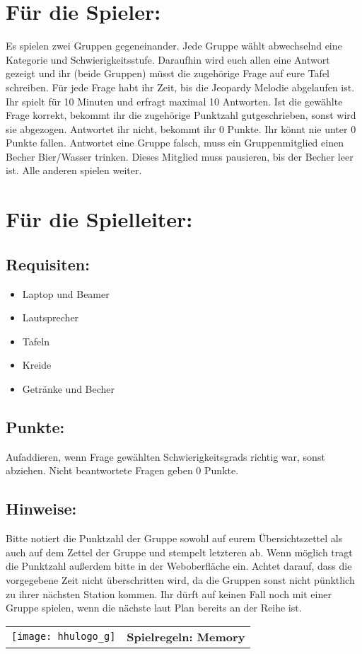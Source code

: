 \documentclass[a4paper,10pt]{article}
\def\spielg{Memory}
\newcommand{\unten}{
 Bitte notiert die Punktzahl der Gruppe sowohl auf eurem Übersichtszettel als auch auf dem Zettel der Gruppe und stempelt letzteren ab. Wenn möglich tragt die Punktzahl außerdem bitte in der Weboberfläche ein.
 Achtet darauf, dass die vorgegebene Zeit nicht überschritten wird, da die Gruppen sonst nicht pünktlich zu ihrer nächsten Station kommen. Ihr dürft auf keinen Fall noch mit einer Gruppe spielen, wenn die nächste laut Plan bereits an der Reihe ist.
}
\begin{document}
\Large
\section*{Für die Spieler:}
Es spielen zwei Gruppen gegeneinander. Jede Gruppe wählt abwechselnd eine Kategorie und Schwierigkeitsstufe. Daraufhin wird euch allen eine Antwort gezeigt und ihr (beide Gruppen) müsst die zugehörige Frage auf eure Tafel schreiben. Für jede Frage habt ihr Zeit, bis die Jeopardy Melodie abgelaufen ist. Ihr spielt für 10 Minuten und erfragt maximal 10 Antworten. Ist die gewählte Frage korrekt, bekommt ihr die zugehörige Punktzahl gutgeschrieben, sonst wird sie abgezogen. Antwortet ihr nicht, bekommt ihr 0 Punkte. Ihr könnt nie unter 0 Punkte fallen. Antwortet eine Gruppe falsch, muss ein Gruppenmitglied einen Becher Bier/Wasser trinken. Dieses Mitglied muss pausieren, bis der Becher leer ist. Alle anderen spielen weiter.

\section*{Für die Spielleiter:}
\subsection*{Requisiten:} 
\begin{itemize}
 \item Laptop und Beamer
 \item Lautsprecher
 \item Tafeln
 \item Kreide
 \item Getränke und Becher
\end{itemize}

\subsection*{Punkte:}
Aufaddieren, wenn Frage gewählten Schwierigkeitsgrads richtig war, sonst abziehen. Nicht beantwortete Fragen geben 0 Punkte.
\subsection*{Hinweise:}
\unten

\newpage


  \begin{tabularx}{\textwidth}{lc}
    \texttt{[image: hhulogo\_g]}
  & {\Huge \textbf{Spielregeln: \spielg}}
  \end{tabularx}\\
\end{document}
